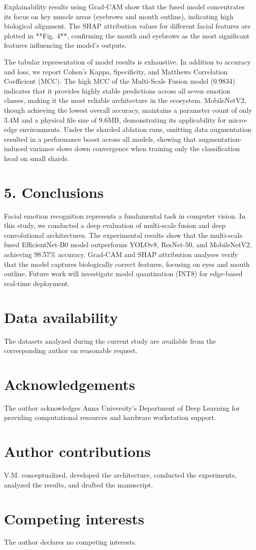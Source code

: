 \documentclass[journal,10pt]{IEEEtran}
\begin{document}
Explainability results using Grad-CAM show that the fused model concentrates its focus on key muscle areas (eyebrows and mouth outline), indicating high biological alignment. The SHAP attribution values for different facial features are plotted in **Fig. 4**, confirming the mouth and eyebrows as the most significant features influencing the model's outputs.

The tabular representation of model results is exhaustive. In addition to accuracy and loss, we report Cohen's Kappa, Specificity, and Matthews Correlation Coefficient (MCC). The high MCC of the Multi-Scale Fusion model (0.9834) indicates that it provides highly stable predictions across all seven emotion classes, making it the most reliable architecture in the ecosystem. MobileNetV2, though achieving the lowest overall accuracy, maintains a parameter count of only 3.4M and a physical file size of 9.6MB, demonstrating its applicability for micro-edge environments. Under the sharded ablation runs, omitting data augmentation resulted in a performance boost across all models, showing that augmentation-induced variance slows down convergence when training only the classification head on small shards.

\section{5. Conclusions}
Facial emotion recognition represents a fundamental task in computer vision. In this study, we conducted a deep evaluation of multi-scale fusion and deep convolutional architectures. The experimental results show that the multi-scale fused EfficientNet-B0 model outperforms YOLOv8, ResNet-50, and MobileNetV2, achieving 98.57\% accuracy. Grad-CAM and SHAP attribution analyses verify that the model captures biologically correct features, focusing on eyes and mouth outline. Future work will investigate model quantization (INT8) for edge-based real-time deployment.

\section{Data availability}
The datasets analyzed during the current study are available from the corresponding author on reasonable request.

\section{Acknowledgements}
The author acknowledges Anna University's Department of Deep Learning for providing computational resources and hardware workstation support.

\section{Author contributions}
V.M. conceptualized, developed the architecture, conducted the experiments, analyzed the results, and drafted the manuscript.

\section{Competing interests}
The author declares no competing interests.
\end{document}
